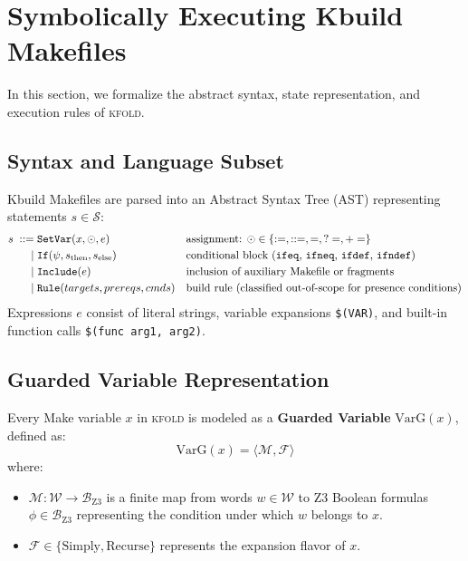 \documentclass[acmsmall,screen,review]{acmart}
\newcommand{\tool}{\textsc{kfold}\xspace}
\begin{document}
\section{Symbolically Executing Kbuild Makefiles}
\label{sec:semantics}

In this section, we formalize the abstract syntax, state representation, and execution rules of \tool.

\subsection{Syntax and Language Subset}
\label{sec:semantics:syntax}

Kbuild Makefiles are parsed into an Abstract Syntax Tree (AST) representing statements $s \in \mathcal{S}$:
\begin{align*}
s \;::=\; &\mathtt{SetVar}(x, \odot, e) &&\text{assignment: } \odot \in \{ \mathtt{:=}, \mathtt{::=}, \mathtt{=}, \mathtt{?=} , \mathtt{+=} \} \\
\mid\; &\mathtt{If}(\psi, s_{\text{then}}, s_{\text{else}}) &&\text{conditional block (\texttt{ifeq}, \texttt{ifneq}, \texttt{ifdef}, \texttt{ifndef})} \\
\mid\; &\mathtt{Include}(e) &&\text{inclusion of auxiliary Makefile or fragments} \\
\mid\; &\mathtt{Rule}(targets, prereqs, cmds) &&\text{build rule (classified out-of-scope for presence conditions)}
\end{align*}
Expressions $e$ consist of literal strings, variable expansions \texttt{\$(VAR)}, and built-in function calls \texttt{\$(func arg1, arg2)}.

\subsection{Guarded Variable Representation}
\label{sec:semantics:varg}

Every Make variable $x$ in \tool is modeled as a \textbf{Guarded Variable} $\text{VarG}(x)$, defined as:
$$\text{VarG}(x) = \langle \mathcal{M}, \mathcal{F} \rangle$$
where:
\begin{itemize}
\item $\mathcal{M}: \mathcal{W} \to \mathcal{B}_{\text{Z3}}$ is a finite map from words $w \in \mathcal{W}$ to Z3 Boolean formulas $\phi \in \mathcal{B}_{\text{Z3}}$ representing the condition under which $w$ belongs to $x$.
\item $\mathcal{F} \in \{ \text{Simply}, \text{Recurse} \}$ represents the expansion flavor of $x$.
\end{itemize}
\end{document}
